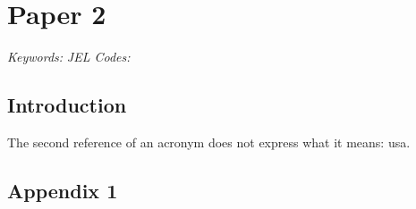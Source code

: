 \chapter{Paper 2}

\begin{abstract}
\end{abstract}

\noindent   \textit{Keywords:}      \newline
            \textit{JEL Codes:}



\pagebreak
\section{Introduction}\label{Paper2_intoduction}

The second reference of an acronym does not express what it means: \Gls{usa}.


\pagebreak




\pagebreak
\begin{subappendices}

\section{Appendix 1}\label{app_1}
 

\end{subappendices}